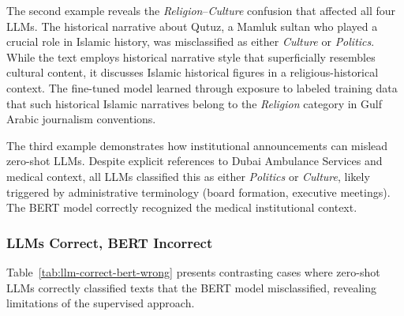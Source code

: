 \documentclass[sn-mathphys-num]{sn-jnl}
\begin{document}
The second example reveals the \textit{Religion}--\textit{Culture} confusion that affected all four LLMs. The historical narrative about Qutuz, a Mamluk sultan who played a crucial role in Islamic history, was misclassified as either \textit{Culture} or \textit{Politics}. While the text employs historical narrative style that superficially resembles cultural content, it discusses Islamic historical figures in a religious-historical context. The fine-tuned model learned through exposure to labeled training data that such historical Islamic narratives belong to the \textit{Religion} category in Gulf Arabic journalism conventions.

The third example demonstrates how institutional announcements can mislead zero-shot LLMs. Despite explicit references to Dubai Ambulance Services and medical context, all LLMs classified this as either \textit{Politics} or \textit{Culture}, likely triggered by administrative terminology (board formation, executive meetings). The BERT model correctly recognized the medical institutional context.

\subsubsection{LLMs Correct, BERT Incorrect}

Table~\ref{tab:llm-correct-bert-wrong} presents contrasting cases where zero-shot LLMs correctly classified texts that the BERT model misclassified, revealing limitations of the supervised approach.
\end{document}
